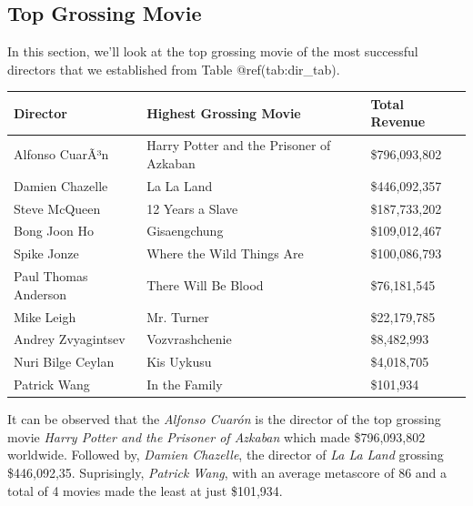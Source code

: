 \documentclass[11pt,a4paper,]{article}
\begin{document}
\hypertarget{top-grossing-movie}{%
\subsection{Top Grossing Movie}\label{top-grossing-movie}}

In this section, we'll look at the top grossing movie of the most successful directors that we established from Table @ref(tab:dir\_tab).

\begin{table}[H]
\centering
\begin{tabular}{l|l|l}
\hline
Director & Highest Grossing Movie & Total Revenue\\
\hline
Alfonso CuarÃ³n & Harry Potter and the Prisoner of Azkaban & \$796,093,802\\
\hline
Damien Chazelle & La La Land & \$446,092,357\\
\hline
Steve McQueen & 12 Years a Slave & \$187,733,202\\
\hline
Bong Joon Ho & Gisaengchung & \$109,012,467\\
\hline
Spike Jonze & Where the Wild Things Are & \$100,086,793\\
\hline
Paul Thomas Anderson & There Will Be Blood & \$76,181,545\\
\hline
Mike Leigh & Mr. Turner & \$22,179,785\\
\hline
Andrey Zvyagintsev & Vozvrashchenie & \$8,482,993\\
\hline
Nuri Bilge Ceylan & Kis Uykusu & \$4,018,705\\
\hline
Patrick Wang & In the Family & \$101,934\\
\hline
\end{tabular}
\end{table}

It can be observed that the \emph{Alfonso Cuarón} is the director of the top grossing movie \emph{Harry Potter and the Prisoner of Azkaban} which made \$796,093,802 worldwide. Followed by, \emph{Damien Chazelle}, the director of \emph{La La Land} grossing \$446,092,35. Suprisingly, \emph{Patrick Wang}, with an average metascore of 86 and a total of 4 movies made the least at just \$101,934.
\end{document}
